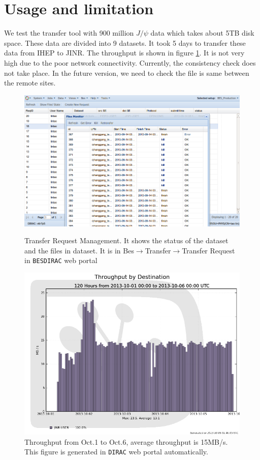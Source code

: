\section{Usage and limitation}
We test the transfer tool with 900 million $J/\psi$ data 
which takes about 5TB disk space. 
These data are divided into 9 datasets.
It took 5 days to transfer 
these data from IHEP to JINR. The throughput is shown in 
figure \ref{fig:throughput}.
It is not very high due to the poor network connectivity.
Currently, the consistency check does not take place.
In the future version, we need to check the file is same between
the remote sites.
\begin{figure}[h]
\begin{minipage}{.49\textwidth}
\includegraphics[width=.95\textwidth, keepaspectratio]{data/transreqlist-with-kill-retransfer.png}
\caption{\label{fig:ui}Transfer Request Management.
It shows the status of the dataset and the files in dataset.
It is in Bes$\to$Transfer$\to$Transfer Request in {\tt BESDIRAC}
web portal}
\end{minipage}
\hspace{.02\textwidth}
\begin{minipage}{.49\textwidth}
\includegraphics[width=.95\textwidth, keepaspectratio]{data/throughput-dest-1001-10-06.png}
\caption{\label{fig:throughput}Throughput from Oct.1 to Oct.6, 
average throughput is 15MB/s. This figure is generated in 
{\tt DIRAC} web portal automatically.}
\end{minipage}
\end{figure}

